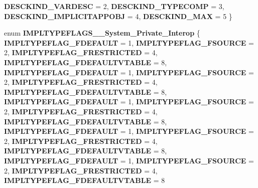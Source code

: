\begin{DoxyCompactItemize}
{\bfseries D\+E\+S\+C\+K\+I\+N\+D\+\_\+\+V\+A\+R\+D\+E\+SC} = 2, 
{\bfseries D\+E\+S\+C\+K\+I\+N\+D\+\_\+\+T\+Y\+P\+E\+C\+O\+MP} = 3, 
\newline
{\bfseries D\+E\+S\+C\+K\+I\+N\+D\+\_\+\+I\+M\+P\+L\+I\+C\+I\+T\+A\+P\+P\+O\+BJ} = 4, 
{\bfseries D\+E\+S\+C\+K\+I\+N\+D\+\_\+\+M\+AX} = 5
 \}
\item 
\mbox{\label{namespace_system_1_1_runtime_1_1_interop_services_1_1_com_types_a1931ab75a38fde1eb6268b4b419ffec5}} 
enum {\bfseries I\+M\+P\+L\+T\+Y\+P\+E\+F\+L\+A\+G\+S\+\_\+\+\_\+\+System\+\_\+\+Private\+\_\+\+Interop} \{ \newline
{\bfseries I\+M\+P\+L\+T\+Y\+P\+E\+F\+L\+A\+G\+\_\+\+F\+D\+E\+F\+A\+U\+LT} = 1, 
{\bfseries I\+M\+P\+L\+T\+Y\+P\+E\+F\+L\+A\+G\+\_\+\+F\+S\+O\+U\+R\+CE} = 2, 
{\bfseries I\+M\+P\+L\+T\+Y\+P\+E\+F\+L\+A\+G\+\_\+\+F\+R\+E\+S\+T\+R\+I\+C\+T\+ED} = 4, 
{\bfseries I\+M\+P\+L\+T\+Y\+P\+E\+F\+L\+A\+G\+\_\+\+F\+D\+E\+F\+A\+U\+L\+T\+V\+T\+A\+B\+LE} = 8, 
\newline
{\bfseries I\+M\+P\+L\+T\+Y\+P\+E\+F\+L\+A\+G\+\_\+\+F\+D\+E\+F\+A\+U\+LT} = 1, 
{\bfseries I\+M\+P\+L\+T\+Y\+P\+E\+F\+L\+A\+G\+\_\+\+F\+S\+O\+U\+R\+CE} = 2, 
{\bfseries I\+M\+P\+L\+T\+Y\+P\+E\+F\+L\+A\+G\+\_\+\+F\+R\+E\+S\+T\+R\+I\+C\+T\+ED} = 4, 
{\bfseries I\+M\+P\+L\+T\+Y\+P\+E\+F\+L\+A\+G\+\_\+\+F\+D\+E\+F\+A\+U\+L\+T\+V\+T\+A\+B\+LE} = 8, 
\newline
{\bfseries I\+M\+P\+L\+T\+Y\+P\+E\+F\+L\+A\+G\+\_\+\+F\+D\+E\+F\+A\+U\+LT} = 1, 
{\bfseries I\+M\+P\+L\+T\+Y\+P\+E\+F\+L\+A\+G\+\_\+\+F\+S\+O\+U\+R\+CE} = 2, 
{\bfseries I\+M\+P\+L\+T\+Y\+P\+E\+F\+L\+A\+G\+\_\+\+F\+R\+E\+S\+T\+R\+I\+C\+T\+ED} = 4, 
{\bfseries I\+M\+P\+L\+T\+Y\+P\+E\+F\+L\+A\+G\+\_\+\+F\+D\+E\+F\+A\+U\+L\+T\+V\+T\+A\+B\+LE} = 8, 
\newline
{\bfseries I\+M\+P\+L\+T\+Y\+P\+E\+F\+L\+A\+G\+\_\+\+F\+D\+E\+F\+A\+U\+LT} = 1, 
{\bfseries I\+M\+P\+L\+T\+Y\+P\+E\+F\+L\+A\+G\+\_\+\+F\+S\+O\+U\+R\+CE} = 2, 
{\bfseries I\+M\+P\+L\+T\+Y\+P\+E\+F\+L\+A\+G\+\_\+\+F\+R\+E\+S\+T\+R\+I\+C\+T\+ED} = 4, 
{\bfseries I\+M\+P\+L\+T\+Y\+P\+E\+F\+L\+A\+G\+\_\+\+F\+D\+E\+F\+A\+U\+L\+T\+V\+T\+A\+B\+LE} = 8, 
\newline
{\bfseries I\+M\+P\+L\+T\+Y\+P\+E\+F\+L\+A\+G\+\_\+\+F\+D\+E\+F\+A\+U\+LT} = 1, 
{\bfseries I\+M\+P\+L\+T\+Y\+P\+E\+F\+L\+A\+G\+\_\+\+F\+S\+O\+U\+R\+CE} = 2, 
{\bfseries I\+M\+P\+L\+T\+Y\+P\+E\+F\+L\+A\+G\+\_\+\+F\+R\+E\+S\+T\+R\+I\+C\+T\+ED} = 4, 
{\bfseries I\+M\+P\+L\+T\+Y\+P\+E\+F\+L\+A\+G\+\_\+\+F\+D\+E\+F\+A\+U\+L\+T\+V\+T\+A\+B\+LE} = 8

\end{DoxyCompactItemize}
